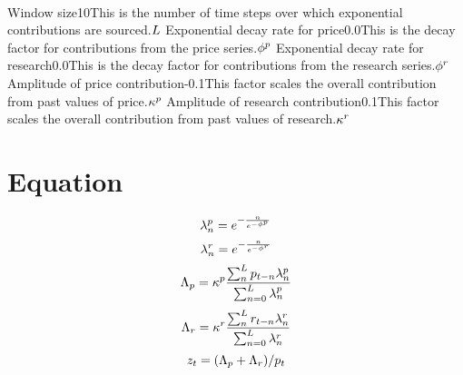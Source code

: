 ﻿﻿\documentclass{article}
\begin{document}
\logo
{} %
\tblofcontents
{}

{Window size}{10}{This is the number of time steps over which exponential contributions are sourced.}{$L$}
{Exponential decay rate for price}{0.0}{This is the decay factor for contributions from the price series.}{$\phi^{p}$}
{Exponential decay rate for research}{0.0}{This is the decay factor for contributions from the research series.}{$\phi^{r}$}
{Amplitude of price contribution}{-0.1}{This factor scales the overall contribution from past values of price.}{$\kappa^{p}$}
{Amplitude of research contribution}{0.1}{This factor scales the overall contribution from past values of research.}{$\kappa^{r}$}
\stoptable

\section{Equation}

\begin{equation}
\lambda_{n}^{p} = e^{-\frac{n}{e^{-\phi^p}}} \\
\end{equation}
\begin{equation}
\lambda_{n}^{r} = e^{-\frac{n}{e^{-\phi^r}}} \\
\end{equation}
\begin{equation}
\Lambda_p = \kappa^p \frac{\sum_{n}^{L} p_{t - n} \lambda_{n}^{p}}{\sum_{n = 0}^{L} \lambda_{n}^{p}} \\
\end{equation}
\begin{equation}
\Lambda_r = \kappa^r \frac{\sum_{n}^{L} r_{t - n} \lambda_{n}^{r}}{\sum_{n = 0}^{L} \lambda_{n}^{r}} \\
\end{equation}
\begin{equation}
z_t = (\Lambda_p+ \Lambda_r)/p_t \\
\end{equation}
\end{document}
